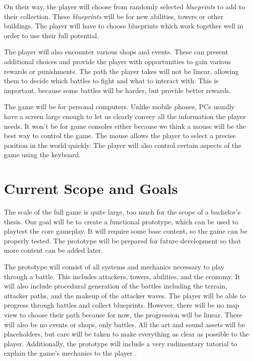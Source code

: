 On their way, the player will choose from randomly selected \emph{blueprints} to add to their collection.
These \emph{blueprints} will be for new abilities, towers or other buildings.
The player will have to choose blueprints which work together well in order to use their full potential.

The player will also encounter various shops and events.
These can present additional choices and provide the player with opportunities to gain various rewards or punishments.
The path the player takes will not be linear, allowing them to decide which battles to fight and what to interact with.
This is important, because some battles will be harder, but provide better rewards.

The game will be for personal computers.
Unlike mobile phones, PCs usually have a screen large enough to let us clearly convey all the information the player needs.
It won't be for game consoles either because we think a mouse will be the best way to control the game.
The mouse allows the player to select a precise position in the world quickly.
The player will also control certain aspects of the game using the keyboard.

\section{Current Scope and Goals}

The scale of the full game is quite large, too much for the scope of a bachelor's thesis.
Our goal will be to create a functional prototype, which can be used to playtest the core gameplay.
It will require some base content, so the game can be properly tested.
The prototype will be prepared for future development so that more content can be added later.

The prototype will consist of all systems and mechanics necessary to play through a battle.
This includes attackers, towers, abilities, and the economy.
It will also include procedural generation of the battles including the terrain, attacker paths, and the makeup of the attacker waves.
The player will be able to progress through battles and collect blueprints.
However, there will be no map view to choose their path because for now, the progression will be linear.
There will also be no events or shops, only battles.
All the art and sound assets will be placeholders, but care will be taken to make everything as clear as possible to the player.
Additionally, the prototype will include a very rudimentary tutorial to explain the game's mechanics to the player .
